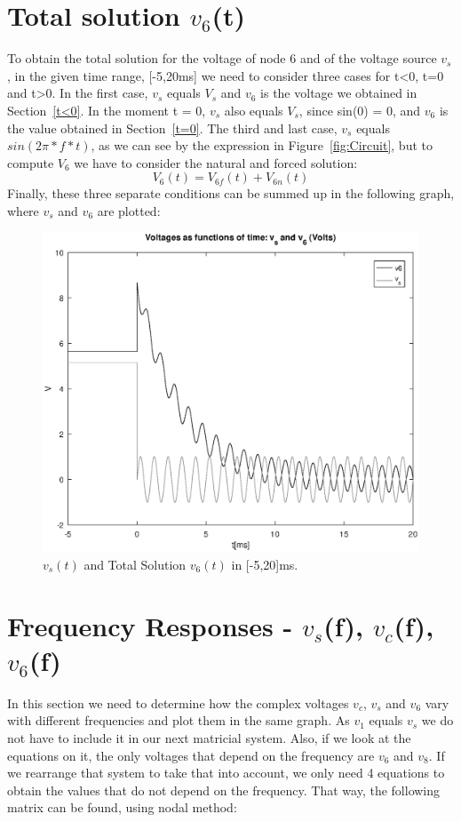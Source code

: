 \section{Total solution $v_6$(t)}
To obtain the total solution for the voltage of node 6 and of the voltage source $v_s$, in the given time range, 
[-5,20ms] we need to consider three cases for t<0, t=0 and t>0.
In the first case, $v_s$ equals $V_s$ and $v_6$ is the voltage we obtained in Section~\ref{t<0}.
In the moment t = 0, $v_s$ also equals $V_s$, since sin(0) = 0, and $v_6$ is the value obtained in Section~\ref{t=0}.
The third and last case, $v_s$ equals $sin(2\pi*f*t)$, as we can see by the expression in Figure~\ref{fig:Circuit}, but to compute $V_6$ we have to consider the natural and forced solution:
\begin{equation}
{V_6}(t) = V_{6f}(t) + V_{6n}(t)
\label{eq:v6fcomplete}
\end{equation}
\noindent Finally, these three separate conditions can be summed up in the following graph, where $v_s$ and $v_6$ are plotted:
\begin{figure}[h!] \centering
\includegraphics[width=0.8\linewidth]{v6.eps}
\caption{$v_{s}(t)$ and Total Solution $v_{6}(t)$ in [-5,20]ms.}
\label{fig:v6t}
\end{figure}

\newpage
\section{Frequency Responses - $v_s$(f), $v_c$(f), $v_6$(f)}
In this section we need to determine how the complex voltages $v_c$, $v_s$ and $v_6$ vary with different frequencies 
and plot them in the same graph. As $v_1$ equals $v_s$ we do not have to include it in our next matricial system. 
Also, if we look at the equations on it, the only voltages that depend on the frequency are $v_6$ and $v_8$. 
If we rearrange that system to take that into account, we only need 4 equations to obtain the values that do not depend on the frequency. 
That way, the following matrix can be found, using nodal method:

